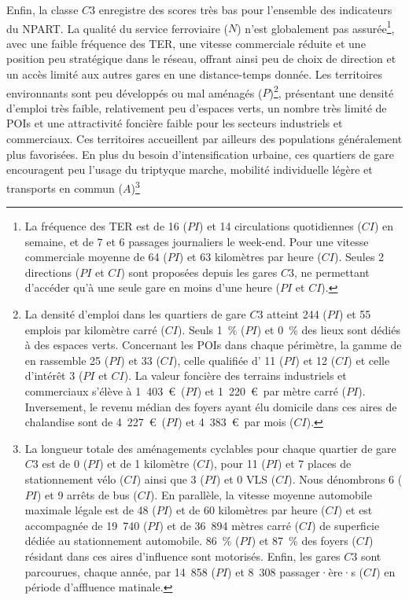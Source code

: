 \begin{refsegment}
Enfin, la classe \(C3\) enregistre des scores très bas pour l’ensemble des indicateurs du \acrshort{NPART}. La qualité du service ferroviaire (\(N\)) n’est globalement pas assurée\footnote{
    La fréquence des \acrshort{TER} est de 16 (\(PI\)) et 14 circulations quotidiennes (\(CI\)) en semaine, et de 7 et 6 passages journaliers le week-end. Pour une vitesse commerciale moyenne de 64 (\(PI\)) et 63 kilomètres par heure (\(CI\)). Seules 2 directions (\(PI\) et \(CI\)) sont proposées depuis les gares \(C3\), ne permettant d'accéder qu'à une seule gare en moins d'une heure (\(PI\) et \(CI\)).
}, avec une faible fréquence des \acrshort{TER}, une vitesse commerciale réduite et une position peu stratégique dans le réseau, offrant ainsi peu de choix de direction et un accès limité aux autres gares en une distance-temps donnée. Les territoires environnants sont peu développés ou mal aménagés (\(P\))\footnote{
    La densité d'emploi dans les quartiers de gare \(C3\) atteint 244 (\(PI\)) et 55 emplois par kilomètre carré (\(CI\)). Seuls 1~\% (\(PI\)) et 0~\% des lieux sont dédiés à des espaces verts. Concernant les \acrshort{POIs} dans chaque périmètre, la gamme de  en rassemble 25 (\(PI\)) et 33 (\(CI\)), celle qualifiée d' 11 (\(PI\)) et 12 (\(CI\)) et celle d'intérêt  3 (\(PI\) et \(CI\)). La valeur foncière des terrains industriels et commerciaux s'élève à 1~403~\euro~(\(PI\)) et 1~220~\euro~par mètre carré (\(PI\)). Inversement, le revenu médian des foyers ayant élu domicile dans ces aires de chalandise sont de 4~227~\euro~(\(PI\)) et 4~383~\euro~par mois (\(CI\)).
}, présentant une densité d’emploi très faible, relativement peu d’espaces verts, un nombre très limité de \acrshort{POIs} et une attractivité foncière faible pour les secteurs industriels et commerciaux. Ces territoires accueillent par ailleurs des populations généralement plus favorisées. En plus du besoin d’intensification urbaine, ces quartiers de gare encouragent peu l’usage du triptyque marche, mobilité individuelle légère et transports en commun (\(A\))\footnote{
    La longueur totale des aménagements cyclables pour chaque quartier de gare \(C3\) est de 0 (\(PI\)) et de 1 kilomètre (\(CI\)), pour 11 (\(PI\)) et 7 places de stationnement vélo (\(CI\)) ainsi que 3 (\(PI\)) et 0 \acrshort{VLS} (\(CI\)). Nous dénombrons 6 (\(PI\)) et 9 arrêts de bus (\(CI\)). En parallèle, la vitesse moyenne automobile maximale légale est de 48 (\(PI\)) et de 60 kilomètres par heure (\(CI\)) et est accompagnée de 19~740 (\(PI\)) et de 36~894 mètres carré (\(CI\)) de superficie dédiée au stationnement automobile. 86~\% (\(PI\)) et 87~\% des foyers (\(CI\)) résidant dans ces aires d'influence sont motorisés. Enfin, les gares \(C3\) sont parcourues, chaque année, par 14~858 (\(PI\)) et 8~308 passager·ère·s (\(CI\)) en période d'affluence matinale.
}
\end{refsegment}
